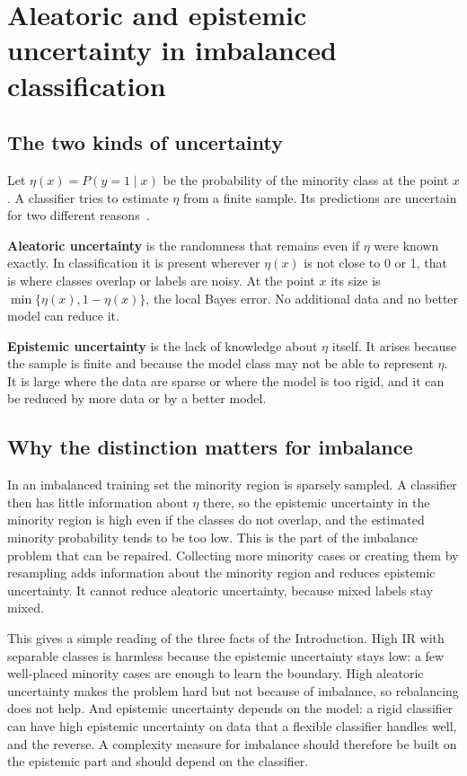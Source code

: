 \documentclass[preprint,12pt]{elsarticle}
\newcommand{\IR}{\mathrm{IR}}
\begin{document}
\section{Aleatoric and epistemic uncertainty in imbalanced classification}\label{sec:unc}
\subsection{The two kinds of uncertainty}
Let $\eta(x)=P(y=1\mid x)$ be the probability of the minority class at the point $x$. A classifier tries to estimate $\eta$ from a finite sample. Its predictions are uncertain for two different reasons~\cite{DerKiureghian2009,Hullermeier2021}.

\textbf{Aleatoric uncertainty} is the randomness that remains even if $\eta$ were known exactly. In classification it is present wherever $\eta(x)$ is not close to 0 or 1, that is where classes overlap or labels are noisy. At the point $x$ its size is $\min\{\eta(x),1-\eta(x)\}$, the local Bayes error. No additional data and no better model can reduce it.

\textbf{Epistemic uncertainty} is the lack of knowledge about $\eta$ itself. It arises because the sample is finite and because the model class may not be able to represent $\eta$. It is large where the data are sparse or where the model is too rigid, and it can be reduced by more data or by a better model.

\subsection{Why the distinction matters for imbalance}
In an imbalanced training set the minority region is sparsely sampled. A classifier then has little information about $\eta$ there, so the epistemic uncertainty in the minority region is high even if the classes do not overlap, and the estimated minority probability tends to be too low. This is the part of the imbalance problem that can be repaired. Collecting more minority cases or creating them by resampling adds information about the minority region and reduces epistemic uncertainty. It cannot reduce aleatoric uncertainty, because mixed labels stay mixed.

This gives a simple reading of the three facts of the Introduction. High $\IR$ with separable classes is harmless because the epistemic uncertainty stays low: a few well-placed minority cases are enough to learn the boundary. High aleatoric uncertainty makes the problem hard but not because of imbalance, so rebalancing does not help. And epistemic uncertainty depends on the model: a rigid classifier can have high epistemic uncertainty on data that a flexible classifier handles well, and the reverse. A complexity measure for imbalance should therefore be built on the epistemic part and should depend on the classifier.
\end{document}

